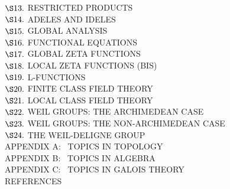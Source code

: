 \qquad $\S13.$ \qquad RESTRICTED PRODUCTS\\

\qquad $\S14.$ \qquad ADELES AND IDELES\\

\qquad $\S15.$ \qquad GLOBAL ANALYSIS\\

\qquad $\S16.$ \qquad FUNCTIONAL EQUATIONS\\

\qquad $\S17.$ \qquad GLOBAL ZETA FUNCTIONS\\

\qquad $\S18.$ \qquad LOCAL ZETA FUNCTIONS (BIS)\\

\qquad $\S19.$ \qquad L-FUNCTIONS\\

\qquad $\S20.$ \qquad FINITE CLASS FIELD THEORY\\

\qquad $\S21.$ \qquad LOCAL CLASS FIELD THEORY\\

\qquad $\S22.$ \qquad WEIL GROUPS: THE ARCHIMEDEAN CASE\\

\qquad $\S23.$ \qquad WEIL GROUPS: THE NON-ARCHIMEDEAN CASE\\

\qquad $\S24.$ \qquad THE WEIL-DELIGNE GROUP\\

\qquad \qquad APPENDIX A: \  TOPICS IN TOPOLOGY\\

\qquad \qquad APPENDIX B: \  TOPICS IN ALGEBRA\\

\qquad \qquad APPENDIX C: \  TOPICS IN GALOIS THEORY\\

\qquad \qquad REFERENCES\\

\endgroup %







